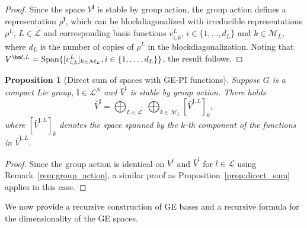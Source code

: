 \documentclass{article}
\newcommand{\rep}[2]{\rho^{#1}_{#2}}
\newcommand{\bV}{{\bar V}}
\newtheorem{proposition}[theorem]{Proposition}
\numberwithin{equation}{section}
\def\bl{{\bm l}}
\def\calM{\mathcal{M}}
\def\calL{\mathcal{L}}
\def\Nat{{N}}
\begin{document}
{\begin{proof}
    Since the space $V^\bl$ is stable by group action, the group action defines a representation $\rep{\bl}{}$, which can be blockdiagonalized with irreducible representations $\rep{L}{}$, $L\in\calL$ and corresponding basis functions $v^L_{i,k}$, $i \in \{1, \ldots, d_L\}$ and $k\in \calM_L$, where $d_L$ is the number of copies of $\rep{L}{}$ in the blockdiagonalization.
    Noting that 
    $V^{\bl,L} = {\rm Span} \{ [v^L_{i,k}]_{k\in \calM_L}, i\in \{1, \ldots, d_L\}  \}$, the result follows.
\end{proof}


\begin{proposition}[Direct sum of spaces with GE-PI functions]
    Suppose $G$ is a compact Lie group,
    $\bl
    \in \calL^\Nat$ and 
    $\bV^\bl$ is stable by group action.
    There holds
    \begin{equation}
    \label{eq:direct_sum_GEPI}
         \bV^{\bl} = \bigoplus_{L \in \calL}  
        \;
        \bigoplus_{k\in \calM_L} [\bV^{\bl,L}]_k,
    \end{equation}
    where $[\bV^{\bl,L}]_k$ denotes the space spanned by the $k$-th component of the functions in $\bV^{\bl,L}$.
\end{proposition}

\begin{proof}
    Since the group action is identical on $V^l$ and $\bV^l$ for $l\in\calL$ using Remark~\ref{rem:group_action}, a similar proof as Proposition~\ref{prop:direct_sum} applies in this case.
\end{proof}


We now provide a recursive construction of GE bases and a recursive formula for the dimensionality of the GE spaces.

}
\end{document}
